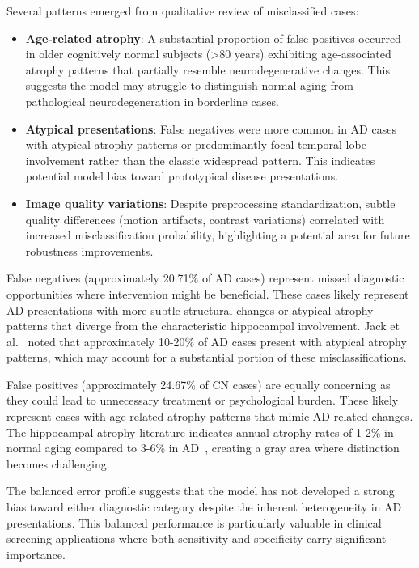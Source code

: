 \documentclass[12pt, a4paper]{article}
\begin{document}
Several patterns emerged from qualitative review of misclassified cases:

\begin{itemize}
    \item \textbf{Age-related atrophy}: A substantial proportion of false positives occurred in older cognitively normal subjects (>80 years) exhibiting age-associated atrophy patterns that partially resemble neurodegenerative changes. This suggests the model may struggle to distinguish normal aging from pathological neurodegeneration in borderline cases.
    
    \item \textbf{Atypical presentations}: False negatives were more common in AD cases with atypical atrophy patterns or predominantly focal temporal lobe involvement rather than the classic widespread pattern. This indicates potential model bias toward prototypical disease presentations.
    
    \item \textbf{Image quality variations}: Despite preprocessing standardization, subtle quality differences (motion artifacts, contrast variations) correlated with increased misclassification probability, highlighting a potential area for future robustness improvements.
\end{itemize}

False negatives (approximately 20.71\% of AD cases) represent missed diagnostic opportunities where intervention might be beneficial. These cases likely represent AD presentations with more subtle structural changes or atypical atrophy patterns that diverge from the characteristic hippocampal involvement. Jack et al.~\cite{jack2013tracking} noted that approximately 10-20\% of AD cases present with atypical atrophy patterns, which may account for a substantial portion of these misclassifications.

False positives (approximately 24.67\% of CN cases) are equally concerning as they could lead to unnecessary treatment or psychological burden. These likely represent cases with age-related atrophy patterns that mimic AD-related changes. The hippocampal atrophy literature indicates annual atrophy rates of 1-2\% in normal aging compared to 3-6\% in AD~\cite{vemuri2010role}, creating a gray area where distinction becomes challenging.

The balanced error profile suggests that the model has not developed a strong bias toward either diagnostic category despite the inherent heterogeneity in AD presentations. This balanced performance is particularly valuable in clinical screening applications where both sensitivity and specificity carry significant importance.
\end{document}
